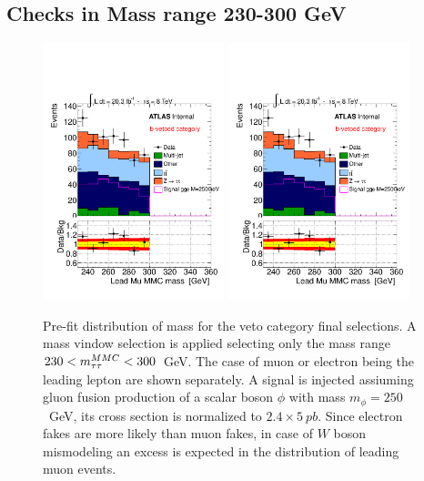 \subsection{Checks in Mass range 230-300 GeV}
\begin{figure}[!hb]
  \centering
  \includegraphics[page=1,width=0.47\textwidth]{figure/limits/vetoM230_300.pdf}
  \includegraphics[page=2,width=0.47\textwidth]{figure/limits/vetoM230_300.pdf}
  \caption{Pre-fit distribution of \mmc mass for the veto category final selections. A mass vindow selection is applied 
	selecting only the mass range $230 < m_{\tau\tau}^{MMC} < 300 $~GeV. The case of muon or electron being the leading lepton are shown separately.
	A signal is injected assiuming gluon fusion production of a scalar boson $\phi$ with mass $m_{\phi} = 250$~GeV, its cross section
	is normalized to $2.4\times5~pb$. Since electron fakes are more likely than muon fakes, in case of $W$ boson mismodeling an
	excess is expected in the distribution of leading muon events.}

\end{figure}

